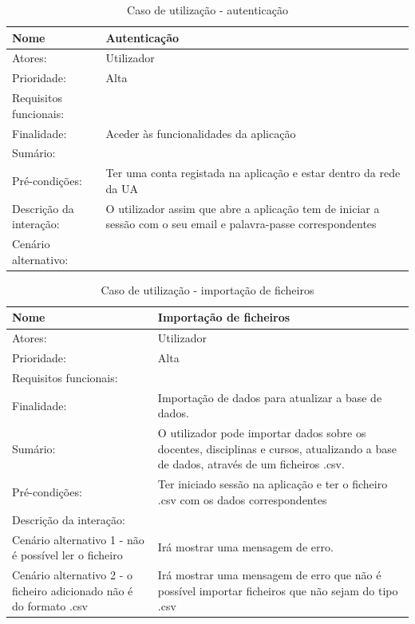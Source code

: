 \documentclass[11pt, twoside]{report}
\begin{document}
	
		
	\begin{table}[H]
		\caption{Caso de utilização - autenticação}
		\begin{center}	
			\begin{tabularx}{\textwidth}{|l|X|}
				\hline
				\textbf{Nome }	& \textbf{Autenticação} \\
				\hline
				Atores: & Utilizador \\
				\hline
				Prioridade: & Alta \\
				\hline
				Requisitos funcionais:&  \\
				\hline
				Finalidade: & Aceder às funcionalidades da aplicação\\
				\hline
				Sumário: &  \\
				\hline
				Pré-condições: & Ter uma conta registada na aplicação e estar dentro da rede da UA\\
				\hline
				Descrição da interação: &  O utilizador assim que abre a aplicação tem de iniciar a sessão com o seu email e palavra-passe correspondentes\\
				\hline
				Cenário alternativo:&\\
				\hline
			\end{tabularx}
		\end{center}
	\end{table}

	
\begin{table}[H]
	\caption{Caso de utilização - importação de ficheiros}
	\begin{center}	
		\begin{tabularx}{\textwidth}{|X|X|}
			\hline
			\textbf{Nome }	& \textbf{Importação de ficheiros}\\
			\hline
			Atores: & Utilizador\\
			\hline
			Prioridade: &  Alta\\
			\hline
			Requisitos funcionais:&  \\
			\hline
			Finalidade: &  Importação de dados para atualizar a base de dados.\\
			\hline
			Sumário: &O utilizador pode importar dados sobre os docentes, disciplinas e cursos, atualizando a base de dados, através de um ficheiros .csv. \\
			\hline
			Pré-condições: & Ter iniciado sessão na aplicação e ter o ficheiro .csv com os dados correspondentes\\
			\hline
			Descrição da interação: &  \\
			\hline
			Cenário alternativo 1 - não é possível ler o ficheiro &Irá mostrar uma mensagem de erro.\\
			\hline
			Cenário alternativo 2 - o ficheiro adicionado não é do formato .csv &Irá mostrar uma mensagem de erro que não é possível importar ficheiros que não sejam do tipo .csv\\
			\hline
		\end{tabularx}
	\end{center}
\end{table}
\end{document}
